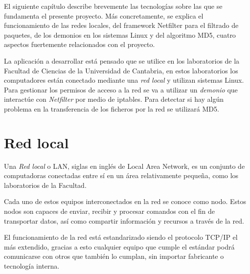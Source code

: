 ﻿%


\label{chap:introduction}


El siguiente cap\'itulo describe brevemente las tecnolog\'ias sobre las que se fundamenta el presente proyecto. M\'as concretamente, se explica el funcionamiento de las redes locales, del framework Netfilter para el filtrado de paquetes, de los demonios en los sistemas Linux\cite{linux:2004} y del algoritmo MD5, cuatro aspectos fuertemente relacionados con el proyecto.
\newline

La aplicación a desarrollar está pensado que se utilice en los laboratorios de la Facultad de Ciencias de la Universidad de Cantabria, en estos laboratorios los computadores están conectado mediante una \emph{red local} y utilizan sistemas Linux. Para gestionar los permisos de acceso a la red se va a utilizar un \emph{demonio} que interactúe con \emph{Netfilter} por medio de iptables. Para detectar si hay algún problema en la transferencia de los ficheros por la red se utilizará MD5.


\chaptertoc

\section{Red local}

Una \emph{Red local} o LAN\cite{redes:2004}, siglas en inglés de Local Area Network, es un conjunto de computadoras conectadas entre sí en un \'area relativamente peque\~na, como los laboratorios de la Facultad.
\newline

Cada uno de estos equipos interconectados en la red se conoce como nodo. Estos nodos son capaces de enviar, recibir y procesar comandos con el fin de transportar datos, así como compartir informaci\'on y recursos a través de la red.
\newline

El funcionamiento de la red está estandarizado siendo el protocolo TCP/IP\cite{TCPIP} el más extendido, gracias a esto cualquier equipo que cumple el estándar podrá comunicarse con otros que también lo cumplan, sin importar fabricante o tecnología interna.
\newline



